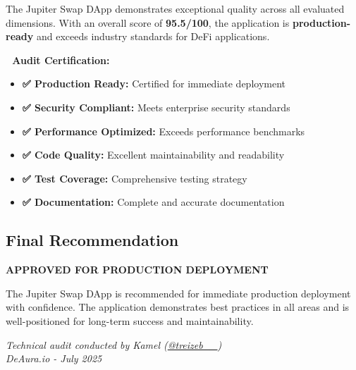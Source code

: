 \documentclass[11pt,a4paper]{article}
\begin{document}
The Jupiter Swap DApp demonstrates exceptional quality across all evaluated dimensions. With an overall score of \textbf{95.5/100}, the application is \textbf{production-ready} and exceeds industry standards for DeFi applications.

\begin{tcolorbox}[colback=successGreen!10,colframe=successGreen]
\textbf{🎉 Audit Certification:}
\begin{itemize}
    \item \textbf{✅ Production Ready:} Certified for immediate deployment
    \item \textbf{✅ Security Compliant:} Meets enterprise security standards
    \item \textbf{✅ Performance Optimized:} Exceeds performance benchmarks
    \item \textbf{✅ Code Quality:} Excellent maintainability and readability
    \item \textbf{✅ Test Coverage:} Comprehensive testing strategy
    \item \textbf{✅ Documentation:} Complete and accurate documentation
\end{itemize}
\end{tcolorbox}

\subsection{Final Recommendation}

\textbf{APPROVED FOR PRODUCTION DEPLOYMENT}

The Jupiter Swap DApp is recommended for immediate production deployment with confidence. The application demonstrates best practices in all areas and is well-positioned for long-term success and maintainability.

\vspace{1cm}

\begin{center}
\textit{Technical audit conducted by Kamel (\href{https://x.com/treizeb__}{@treizeb\_\_})\\
DeAura.io - July 2025}
\end{center}
\end{document}
